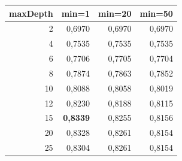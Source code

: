 \begin{tabular}{rrrr}
\toprule
maxDepth & min=1 & min=20 & min=50 \\
\midrule
2 & 0,6970 & 0,6970 & 0,6970 \\
4 & 0,7535 & 0,7535 & 0,7535 \\
6 & 0,7706 & 0,7705 & 0,7704 \\
8 & 0,7874 & 0,7863 & 0,7852 \\
10 & 0,8088 & 0,8058 & 0,8019 \\
12 & 0,8230 & 0,8188 & 0,8115 \\
15 & \textbf{0,8339} & 0,8255 & 0,8156 \\
20 & 0,8328 & 0,8261 & 0,8154 \\
25 & 0,8304 & 0,8261 & 0,8154 \\
\bottomrule
\end{tabular}
